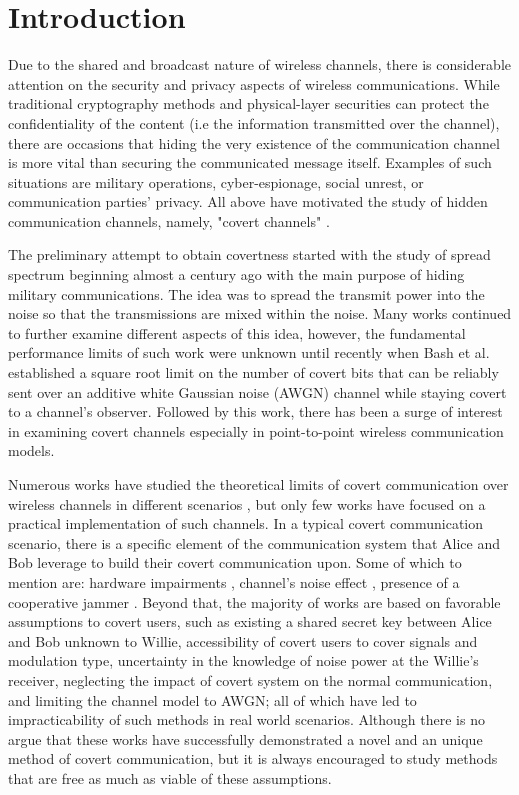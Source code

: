 \section{Introduction}
\label{s:intro}
Due to the shared and broadcast nature of wireless channels, there is considerable attention on the security and privacy aspects of wireless communications. While traditional cryptography methods and physical-layer securities can protect the confidentiality of the content (i.e the information transmitted over the channel), there are occasions that hiding the very existence of the communication channel is more vital than securing the communicated message itself. Examples of such situations are military operations, cyber-espionage, social unrest, or communication parties' privacy. All above have motivated the study of hidden communication channels, namely, "covert channels" \cite{lampson1973note}.


The preliminary attempt to obtain covertness started with the study of spread spectrum beginning almost a century ago with the main purpose of hiding military communications. The idea was to spread the transmit power into the noise so that the transmissions are mixed within the noise. Many works continued to further examine different aspects of this idea, however, the fundamental performance limits of such work were unknown until recently when Bash et al. \cite{bash2012square} established a square root limit on the number of covert bits that can be reliably sent over an additive white Gaussian noise (AWGN) channel while staying covert to a channel's observer. Followed by this work, there has been a surge of interest in examining covert channels \cite{sobers2017covert,soltani2018covert} especially in point-to-point wireless communication models.


Numerous works have studied the theoretical limits of covert communication over wireless channels in different scenarios \cite{bash2012square, soltani2018covert, sheikholeslami2018multi, li2021fundamental}, but only few works have focused on a practical implementation of such channels. In a typical covert communication scenario, there is a specific element of the communication system that Alice and Bob leverage to build their covert communication upon. Some of which to mention are: hardware impairments \cite{mohammed2021adversarial}, channel's noise effect \cite{soltani2018covert}, presence of a cooperative jammer \cite{sobers2017covert}. Beyond that, the majority of works are based on favorable assumptions to covert users, such as existing a shared secret key between Alice and Bob unknown to Willie, accessibility of covert users to cover signals and modulation type, uncertainty in the knowledge of noise power at the Willie's receiver, neglecting the impact of covert system on the normal communication, and limiting the channel model to AWGN; all of which have led to impracticability of such methods in real world scenarios. Although there is no argue that these works have successfully demonstrated a novel and an unique method of covert communication, but it is always encouraged to study methods that are free as much as viable of these assumptions.


